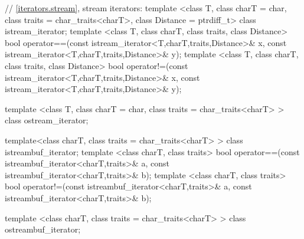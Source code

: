 \begin{codeblock}

  // \ref{iterators.stream}, stream iterators:
  template <class T, class charT = char, class traits = char_traits<charT>,
      class Distance = ptrdiff_t>
  class istream_iterator;
  template <class T, class charT, class traits, class Distance>
    bool operator==(const istream_iterator<T,charT,traits,Distance>& x,
            const istream_iterator<T,charT,traits,Distance>& y);
  template <class T, class charT, class traits, class Distance>
    bool operator!=(const istream_iterator<T,charT,traits,Distance>& x,
            const istream_iterator<T,charT,traits,Distance>& y);

  template <class T, class charT = char, class traits = char_traits<charT> >
      class ostream_iterator;

  template<class charT, class traits = char_traits<charT> >
    class istreambuf_iterator;
  template <class charT, class traits>
    bool operator==(const istreambuf_iterator<charT,traits>& a,
            const istreambuf_iterator<charT,traits>& b);
  template <class charT, class traits>
    bool operator!=(const istreambuf_iterator<charT,traits>& a,
            const istreambuf_iterator<charT,traits>& b);

  template <class charT, class traits = char_traits<charT> >
    class ostreambuf_iterator;


\end{codeblock}

